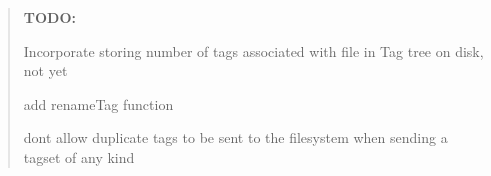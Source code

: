 {\bfseries \begin{quote}
{\bfseries T\+O\+DO\+:}
\begin{DoxyEnumerate}
\item Incorporate storing number of tags associated with file in Tag tree on disk, not yet
\item add rename\+Tag function
\item don\textquotesingle{}t allow duplicate tags to be sent to the filesystem when sending a tagset of any kind
\end{DoxyEnumerate}\end{quote}
}